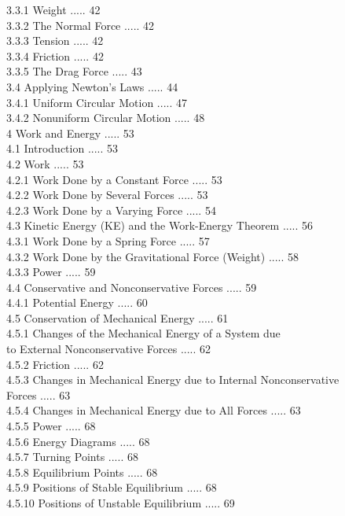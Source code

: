 \documentclass[10pt]{article}
\begin{document}
3.3.1 Weight ..... 42\\
3.3.2 The Normal Force ..... 42\\
3.3.3 Tension ..... 42\\
3.3.4 Friction ..... 42\\
3.3.5 The Drag Force ..... 43\\
3.4 Applying Newton's Laws ..... 44\\
3.4.1 Uniform Circular Motion ..... 47\\
3.4.2 Nonuniform Circular Motion ..... 48\\
4 Work and Energy ..... 53\\
4.1 Introduction ..... 53\\
4.2 Work ..... 53\\
4.2.1 Work Done by a Constant Force ..... 53\\
4.2.2 Work Done by Several Forces ..... 53\\
4.2.3 Work Done by a Varying Force ..... 54\\
4.3 Kinetic Energy (KE) and the Work-Energy Theorem ..... 56\\
4.3.1 Work Done by a Spring Force ..... 57\\
4.3.2 Work Done by the Gravitational Force (Weight) ..... 58\\
4.3.3 Power ..... 59\\
4.4 Conservative and Nonconservative Forces ..... 59\\
4.4.1 Potential Energy ..... 60\\
4.5 Conservation of Mechanical Energy ..... 61\\
4.5.1 Changes of the Mechanical Energy of a System due\\
to External Nonconservative Forces ..... 62\\
4.5.2 Friction ..... 62\\
4.5.3 Changes in Mechanical Energy due to Internal Nonconservative\\
Forces ..... 63\\
4.5.4 Changes in Mechanical Energy due to All Forces ..... 63\\
4.5.5 Power ..... 68\\
4.5.6 Energy Diagrams ..... 68\\
4.5.7 Turning Points ..... 68\\
4.5.8 Equilibrium Points ..... 68\\
4.5.9 Positions of Stable Equilibrium ..... 68\\
4.5.10 Positions of Unstable Equilibrium ..... 69\\
\end{document}
